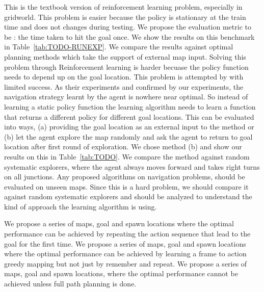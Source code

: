 \begin{description}
    This is the textbook version of reinforcement learning problem,
    especially in gridworld. This problem is easier because the policy
    is stationary at the train time and does not changes during
    testing.
    We propose the evaluation metric to be : the time taken to hit the goal once. We show the results on this benchmark in Table~\ref{tab:TODO-RUNEXP}.
    We compare the results against optimal planning methods which take the support of external map input.
    Solving this problem through Reinforcement learning is harder becuase the policy function needs to depend up on the goal location.
    This problem is attempted by \cite{MiPaViICLR2017} with limited success.
    As their experiments and confirmed by our experiments, the navigation strategy learnt by the agent is nowhere near optimal.
    So instead of learning a static policy function the learning algorithm needs to learn a function that returns a different policy for different goal locations.
    This can be evaluated into ways, (a) providing the goal location as an external input to the method or (b) let the agent explore the map randomly and ask the agent to return to goal location after first round of exploration.
    We chose method (b) and show our results on this in Table~\ref{tab:TODO}.
    We compare the method against random systematic explorers, where the agent always moves forward and takes right turns on all junctions.
    Any proposed algorithms on navigation problems, should be evaluated on unseen maps.
    Since this is a hard problem, we should compare it against random systematic explorers and should be analyzed to understand the kind of approach the learning algorithm is using.
    \begin{description}
        We propose a series of maps, goal and spawn locations where the optimal performance can be achieved by repeating the action sequence that lead to the goal for the first time.
        We propose a series of maps, goal and spawn locations where the optimal performance can be achieved by learning a frame to action greedy mapping but not just by remember and repeat.
        We propose a series of maps, goal and spawn locations, where the optimal performance cannot be achieved unless full path planning is done.
    \end{description}
\end{description}


